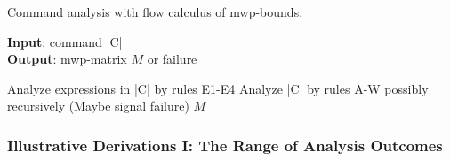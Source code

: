 \begin{algorithm}
\caption{Command analysis with flow calculus of mwp-bounds.}\label{alg:comms}
\textbf{Input}: command \pr|C| \\
\textbf{Output}: mwp-matrix \(M\) or failure
\begin{algorithmic}[1]
\State Analyze expressions in \pr|C| by rules E1-E4
\State Analyze \pr|C| by rules A-W possibly recursively
\State (Maybe signal failure)
\State \Return \(M\) 
\end{algorithmic}
\end{algorithm}

\subsubsection{Illustrative Derivations I: The Range of Analysis Outcomes}\label{mwp-derivations}

